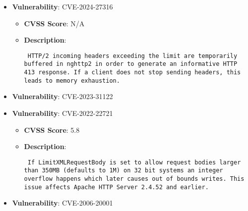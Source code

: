 \documentclass{article}
\begin{document}
\begin{itemize}
        \item \textbf{Vulnerability}: CVE-2024-27316
        \begin{itemize}
            \item \textbf{CVSS Score}:  N/A 
            \item \textbf{Description}: \parbox{\linewidth}{\texttt{ HTTP/2 incoming headers exceeding the limit are temporarily buffered in nghttp2 in order to generate an informative HTTP 413 response. If a client does not stop sending headers, this leads to memory exhaustion. }}
        \end{itemize}
    
        \item \textbf{Vulnerability}: CVE-2023-31122
    
        \item \textbf{Vulnerability}: CVE-2022-22721
        \begin{itemize}
            \item \textbf{CVSS Score}:  5.8 
            \item \textbf{Description}: \parbox{\linewidth}{\texttt{ If LimitXMLRequestBody is set to allow request bodies larger than 350MB (defaults to 1M) on 32 bit systems an integer overflow happens which later causes out of bounds writes. This issue affects Apache HTTP Server 2.4.52 and earlier. }}
        \end{itemize}
    
        \item \textbf{Vulnerability}: CVE-2006-20001
    

\end{itemize}
\end{document}
